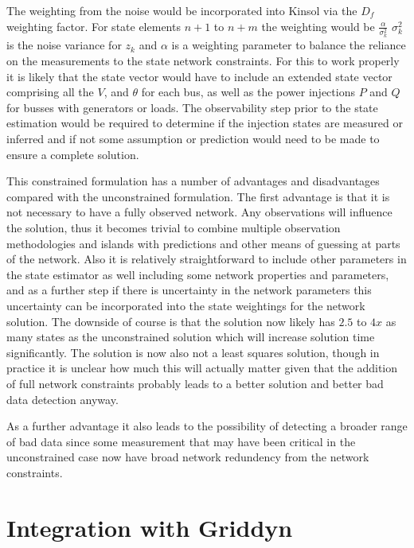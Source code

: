 \documentclass[11pt]{article} %
\begin{document}
The weighting from the noise would be incorporated into Kinsol via the $D_f$ weighting factor.  For state elements $n+1$ to $n+m$ the weighting would be $\frac{\alpha}{\sigma_k^2}$  $\sigma_k^2$ is the noise variance for $z_k$ and $\alpha$ is a weighting parameter to balance the reliance on the measurements to the state network constraints.  For this to work properly it is likely that the state vector would have to include an extended state vector comprising all the $V$, and $\theta$ for each bus,  as well as the power injections $P$ and $Q$ for busses with generators or loads.  The observability step prior to the state estimation would be required to determine if the injection states are measured or inferred and if not some assumption or prediction would need to be made to ensure a complete solution.  

This constrained formulation has a number of advantages and disadvantages compared with the unconstrained formulation.  The first advantage is that it is not necessary to have a fully observed network.  Any observations will influence the solution, thus it becomes trivial to combine multiple observation methodologies and islands with predictions and other means of guessing at parts of the network.  Also it is relatively straightforward to include other parameters in the state estimator as well including some network properties and parameters, and as a further step if there is uncertainty in the network parameters this uncertainty can be incorporated into the state weightings for the network solution.  The downside of course is that the solution now likely has $2.5$ to $4x$ as many states as the unconstrained solution which will increase solution time significantly.  The solution is now also not a least squares solution,  though in practice it is unclear how much this will actually matter given that the addition of full network constraints probably leads to a better solution and better bad data detection anyway.  

As a further advantage it also leads to the possibility of detecting a broader range of bad data since some measurement that may have been critical in the unconstrained case now have broad network redundency from the network constraints.  

\section{Integration with Griddyn}
\end{document}

